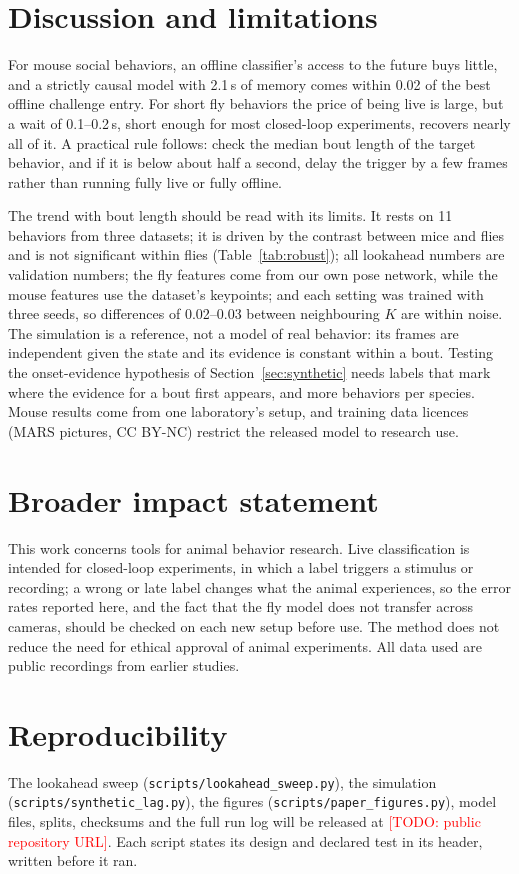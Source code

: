 \documentclass[10pt]{article}
\newcommand{\todo}[1]{\textcolor{red}{[TODO: #1]}}
\begin{document}
\section{Discussion and limitations}

For mouse social behaviors, an offline classifier's access to the future buys little, and a strictly causal model with 2.1\,s of memory comes within 0.02 of the best offline challenge entry. For short fly behaviors the price of being live is large, but a wait of 0.1--0.2\,s, short enough for most closed-loop experiments, recovers nearly all of it. A practical rule follows: check the median bout length of the target behavior, and if it is below about half a second, delay the trigger by a few frames rather than running fully live or fully offline.

The trend with bout length should be read with its limits. It rests on 11 behaviors from three datasets; it is driven by the contrast between mice and flies and is not significant within flies (Table~\ref{tab:robust}); all lookahead numbers are validation numbers; the fly features come from our own pose network, while the mouse features use the dataset's keypoints; and each setting was trained with three seeds, so differences of 0.02--0.03 between neighbouring $K$ are within noise. The simulation is a reference, not a model of real behavior: its frames are independent given the state and its evidence is constant within a bout. Testing the onset-evidence hypothesis of Section~\ref{sec:synthetic} needs labels that mark where the evidence for a bout first appears, and more behaviors per species. Mouse results come from one laboratory's setup, and training data licences (MARS pictures, CC BY-NC) restrict the released model to research use.

\section*{Broader impact statement}
This work concerns tools for animal behavior research. Live classification is intended for closed-loop experiments, in which a label triggers a stimulus or recording; a wrong or late label changes what the animal experiences, so the error rates reported here, and the fact that the fly model does not transfer across cameras, should be checked on each new setup before use. The method does not reduce the need for ethical approval of animal experiments. All data used are public recordings from earlier studies.

\section*{Reproducibility}
The lookahead sweep (\texttt{scripts/lookahead\_sweep.py}), the simulation (\texttt{scripts/synthetic\_lag.py}), the figures (\texttt{scripts/paper\_figures.py}), model files, splits, checksums and the full run log will be released at \todo{public repository URL}. Each script states its design and declared test in its header, written before it ran.
\end{document}
